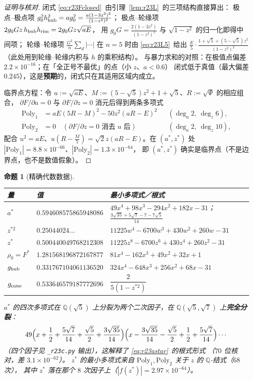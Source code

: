 \documentclass[UTF8,11pt]{ctexart}
\newtheorem{proposition}[theorem]{命题}
\theoremstyle{definition}
\newcommand{\Q}{\mathbb{Q}}
\begin{document}
\begin{proof}[证明与核对]
闭式 \eqref{eq:r23Fclosed}~由引理~\ref{lem:r23L}~的三项结构直接算出：
极点--极点项 $g_0^2h_{\rm hub}^2=a g_0^2=\frac{a(1-3z^2)^2}{(1-z^2)^2}$；
极点--轮缘项 $2g_0Gz\,h_{\rm hub}h_{\rm rim}=2g_0Gz\sqrt{aE}$，
用 $g_0G=\frac{2(1-3z^2)}{(1-z^2)^2}$ 与 $\sqrt{1-z^2}$ 的归一化即得中间项；
轮缘--轮缘项 $\frac{G^2}n\sum_d|\cdots|$ 在 $n=5$ 时由 \eqref{eq:r23L5}~给出
$\frac{E}{5}\cdot\frac{1+\sqrt5+(5-\sqrt5)z^2}{(1-z^2)^2}$（此处用到轮缘--轮缘内积与 $h$ 的乘积结构）。
与暴力求和的对照：在极值点偏差 $2.2\times10^{-16}$；在「全正号不最优」的点（小 $z$、$a<0.6$）
闭式低于真值（最大偏差 $0.245$），这是\textbf{预期}的，闭式只在其适用区域内成立。

临界点方程：令 $u:=\sqrt{aE}$、$M:=(5-\sqrt5)z^2+1+\sqrt5$、$R:=\sqrt\Psi$ 的相应组合，
$\partial F/\partial a=0$ 与 $\partial F/\partial z=0$ 消元后得到两条多项式
\begin{align}
\mathrm{Poly}_1&=aE(5R-M)^2-50z^2(aR-E)^2 &&(\deg_a2,\ \deg_z6),\label{eq:r23poly1}\\
\mathrm{Poly}_2&=0\quad(\partial F/\partial z=0\text{ 消去 }u\text{ 后}) &&(\deg_a2,\ \deg_{z}10),\label{eq:r23poly2}
\end{align}
配合 $u^2=aE$、$u(R-\frac M5)=\sqrt2z(aR-E)$。在 $(a^*,z^*)$ 处
$|\mathrm{Poly}_1|=8.8\times10^{-66}$、$|\mathrm{Poly}_2|=1.3\times10^{-64}$，
即 $(a^*,z^*)$ 确实是临界点（不是边界点，也不是数值假象）。
\end{proof}

\begin{proposition}[精确代数数据]\label{prop:r23alg}
\begin{center}\small
\begin{tabular}{lll}
\toprule
量 & 值 & 最小多项式／根式\\
\midrule
$a^*$ & $0.594608575865948086$ & $49x^4+98x^3-294x^2+182x-31$；$\frac{3\sqrt{35}+5\sqrt7-7-7\sqrt5}{14}$\\
$z^{*2}$ & $0.25044024\ldots$ & $11225w^4-6700w^3+430w^2+260w-31$\\
$z^*$ & $0.500440049768212308$ & $11225z^8-6700z^6+430z^4+260z^2-31$\\
$\rho_0=F^*$ & $1.281568196872167877$ & $81x^4-162x^3+49x^2+32x+1$\\
$g_{\rm hub}$ & $0.331767104061136520$ & $324x^4-648x^3+256x^2+68x-31$\\
$g_{\rm cone}$ & $0.533646579187772696$ & $\dfrac2{5(1-z^{*2})}$\\
\bottomrule
\end{tabular}
\end{center}
$a^*$ 的四次多项式在 $\Q(\sqrt5)$ 上分裂为两个二次因子，在 $\Q(\sqrt5,\sqrt7)$ 上\textbf{完全分裂}：
\[
49\Bigl(x+\frac12+\frac{5\sqrt7}{14}+\frac{\sqrt5}2+\frac{3\sqrt{35}}{14}\Bigr)
\Bigl(x-\frac{3\sqrt{35}}{14}-\frac{\sqrt5}2+\frac12+\frac{5\sqrt7}{14}\Bigr)\cdots
\]
（四个因子见 \texttt{\_r23c.py} 输出），这解释了 \eqref{eq:r23astar}~的根式形式
（$70$ 位核对，差 $3.1\times10^{-62}$）。
$z^*$ 的最小多项式来自 $\mathrm{Poly}_1,\mathrm{Poly}_2$ 关于 $z$ 的 $\Q$-结式（$68$ 次），
其中 $z^*$ 落在那个 $8$ 次因子上（$|f(z^*)|=2.97\times10^{-64}$）。
\end{proposition}
\end{document}
